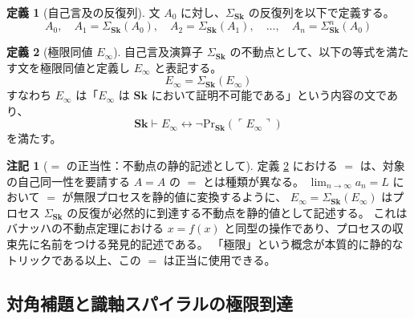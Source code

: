 \documentclass[11pt,a4paper]{article}
\theoremstyle{definition}
\newtheorem{definition}{定義}[section]
\newtheorem{remark}{注記}[section]
\newcommand{\Sk}{\mathbf{Sk}}
\newcommand{\PrSk}{\mathrm{Pr}_{\Sk}}
\newcommand{\Einf}{E_{\infty}}
\newcommand{\SigmaSk}{\Sigma_{\Sk}}
\begin{document}
\begin{definition}[自己言及の反復列]\label{def:self-reference-seq}
文 $A_0$ に対し、$\SigmaSk$ の反復列を以下で定義する。
\begin{equation}
A_0, \quad A_1 = \SigmaSk(A_0), \quad A_2 = \SigmaSk(A_1), \quad \ldots, \quad A_n = \SigmaSk^n(A_0)
\end{equation}
\end{definition}

\begin{definition}[極限同値 $\Einf$]\label{def:e-infinity}
自己言及演算子 $\SigmaSk$ の不動点として、以下の等式を満たす文を極限同値と定義し $\Einf$ と表記する。
\begin{equation}
\Einf = \SigmaSk(\Einf)
\end{equation}
すなわち $\Einf$ は「$\Einf$ は $\Sk$ において証明不可能である」という内容の文であり、
\begin{equation}
\Sk \vdash \Einf \leftrightarrow \neg\PrSk(\ulcorner \Einf \urcorner)
\end{equation}
を満たす。
\end{definition}

\begin{remark}[$=$ の正当性：不動点の静的記述として]\label{rem:equality-justification}
定義 \ref{def:e-infinity} における $=$ は、対象の自己同一性を要請する $A=A$ の $=$ とは種類が異なる。
$\lim_{n\to\infty} a_n = L$ において $=$ が無限プロセスを静的値に変換するように、
$\Einf = \SigmaSk(\Einf)$ はプロセス $\SigmaSk$ の反復が必然的に到達する不動点を静的値として記述する。
これはバナッハの不動点定理における $x = f(x)$ と同型の操作であり、プロセスの収束先に名前をつける発見的記述である。
「極限」という概念が本質的に静的なトリックである以上、この $=$ は正当に使用できる。
\end{remark}

\subsection{対角補題と識軸スパイラルの極限到達}
\end{document}
